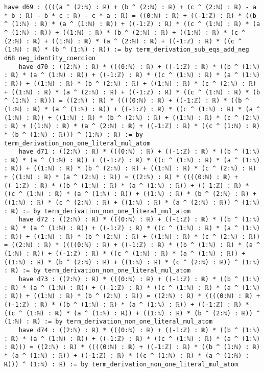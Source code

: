 \documentclass{article}
\begin{document}
\begin{tcolorbox}[colback=white!10, width=\linewidth]
\begin{lstlisting}[language=Lean4]
    have d69 : ((((a ^ (2:ℕ) : ℝ) + (b ^ (2:ℕ) : ℝ) + (c ^ (2:ℕ) : ℝ) - a * b : ℝ) - b * c : ℝ) - c * a : ℝ) = ((0:ℕ) : ℝ) + ((-1:ℤ) : ℝ) * ((b ^ (1:ℕ) : ℝ) * (a ^ (1:ℕ) : ℝ)) + ((-1:ℤ) : ℝ) * ((c ^ (1:ℕ) : ℝ) * (a ^ (1:ℕ) : ℝ)) + ((1:ℕ) : ℝ) * (b ^ (2:ℕ) : ℝ) + ((1:ℕ) : ℝ) * (c ^ (2:ℕ) : ℝ) + ((1:ℕ) : ℝ) * (a ^ (2:ℕ) : ℝ) + ((-1:ℤ) : ℝ) * ((c ^ (1:ℕ) : ℝ) * (b ^ (1:ℕ) : ℝ)) := by term_derivation_sub_eqs_add_neg d68 neg_identity_coercion
    have d70 : ((2:ℕ) : ℝ) * (((0:ℕ) : ℝ) + ((-1:ℤ) : ℝ) * ((b ^ (1:ℕ) : ℝ) * (a ^ (1:ℕ) : ℝ)) + ((-1:ℤ) : ℝ) * ((c ^ (1:ℕ) : ℝ) * (a ^ (1:ℕ) : ℝ)) + ((1:ℕ) : ℝ) * (b ^ (2:ℕ) : ℝ) + ((1:ℕ) : ℝ) * (c ^ (2:ℕ) : ℝ) + ((1:ℕ) : ℝ) * (a ^ (2:ℕ) : ℝ) + ((-1:ℤ) : ℝ) * ((c ^ (1:ℕ) : ℝ) * (b ^ (1:ℕ) : ℝ))) = ((2:ℕ) : ℝ) * ((((0:ℕ) : ℝ) + ((-1:ℤ) : ℝ) * ((b ^ (1:ℕ) : ℝ) * (a ^ (1:ℕ) : ℝ)) + ((-1:ℤ) : ℝ) * ((c ^ (1:ℕ) : ℝ) * (a ^ (1:ℕ) : ℝ)) + ((1:ℕ) : ℝ) * (b ^ (2:ℕ) : ℝ) + ((1:ℕ) : ℝ) * (c ^ (2:ℕ) : ℝ) + ((1:ℕ) : ℝ) * (a ^ (2:ℕ) : ℝ) + ((-1:ℤ) : ℝ) * ((c ^ (1:ℕ) : ℝ) * (b ^ (1:ℕ) : ℝ))) ^ (1:ℕ) : ℝ) := by term_derivation_non_one_literal_mul_atom
    have d71 : ((2:ℕ) : ℝ) * (((0:ℕ) : ℝ) + ((-1:ℤ) : ℝ) * ((b ^ (1:ℕ) : ℝ) * (a ^ (1:ℕ) : ℝ)) + ((-1:ℤ) : ℝ) * ((c ^ (1:ℕ) : ℝ) * (a ^ (1:ℕ) : ℝ)) + ((1:ℕ) : ℝ) * (b ^ (2:ℕ) : ℝ) + ((1:ℕ) : ℝ) * (c ^ (2:ℕ) : ℝ) + ((1:ℕ) : ℝ) * (a ^ (2:ℕ) : ℝ)) = ((2:ℕ) : ℝ) * ((((0:ℕ) : ℝ) + ((-1:ℤ) : ℝ) * ((b ^ (1:ℕ) : ℝ) * (a ^ (1:ℕ) : ℝ)) + ((-1:ℤ) : ℝ) * ((c ^ (1:ℕ) : ℝ) * (a ^ (1:ℕ) : ℝ)) + ((1:ℕ) : ℝ) * (b ^ (2:ℕ) : ℝ) + ((1:ℕ) : ℝ) * (c ^ (2:ℕ) : ℝ) + ((1:ℕ) : ℝ) * (a ^ (2:ℕ) : ℝ)) ^ (1:ℕ) : ℝ) := by term_derivation_non_one_literal_mul_atom
    have d72 : ((2:ℕ) : ℝ) * (((0:ℕ) : ℝ) + ((-1:ℤ) : ℝ) * ((b ^ (1:ℕ) : ℝ) * (a ^ (1:ℕ) : ℝ)) + ((-1:ℤ) : ℝ) * ((c ^ (1:ℕ) : ℝ) * (a ^ (1:ℕ) : ℝ)) + ((1:ℕ) : ℝ) * (b ^ (2:ℕ) : ℝ) + ((1:ℕ) : ℝ) * (c ^ (2:ℕ) : ℝ)) = ((2:ℕ) : ℝ) * ((((0:ℕ) : ℝ) + ((-1:ℤ) : ℝ) * ((b ^ (1:ℕ) : ℝ) * (a ^ (1:ℕ) : ℝ)) + ((-1:ℤ) : ℝ) * ((c ^ (1:ℕ) : ℝ) * (a ^ (1:ℕ) : ℝ)) + ((1:ℕ) : ℝ) * (b ^ (2:ℕ) : ℝ) + ((1:ℕ) : ℝ) * (c ^ (2:ℕ) : ℝ)) ^ (1:ℕ) : ℝ) := by term_derivation_non_one_literal_mul_atom
    have d73 : ((2:ℕ) : ℝ) * (((0:ℕ) : ℝ) + ((-1:ℤ) : ℝ) * ((b ^ (1:ℕ) : ℝ) * (a ^ (1:ℕ) : ℝ)) + ((-1:ℤ) : ℝ) * ((c ^ (1:ℕ) : ℝ) * (a ^ (1:ℕ) : ℝ)) + ((1:ℕ) : ℝ) * (b ^ (2:ℕ) : ℝ)) = ((2:ℕ) : ℝ) * ((((0:ℕ) : ℝ) + ((-1:ℤ) : ℝ) * ((b ^ (1:ℕ) : ℝ) * (a ^ (1:ℕ) : ℝ)) + ((-1:ℤ) : ℝ) * ((c ^ (1:ℕ) : ℝ) * (a ^ (1:ℕ) : ℝ)) + ((1:ℕ) : ℝ) * (b ^ (2:ℕ) : ℝ)) ^ (1:ℕ) : ℝ) := by term_derivation_non_one_literal_mul_atom
    have d74 : ((2:ℕ) : ℝ) * (((0:ℕ) : ℝ) + ((-1:ℤ) : ℝ) * ((b ^ (1:ℕ) : ℝ) * (a ^ (1:ℕ) : ℝ)) + ((-1:ℤ) : ℝ) * ((c ^ (1:ℕ) : ℝ) * (a ^ (1:ℕ) : ℝ))) = ((2:ℕ) : ℝ) * ((((0:ℕ) : ℝ) + ((-1:ℤ) : ℝ) * ((b ^ (1:ℕ) : ℝ) * (a ^ (1:ℕ) : ℝ)) + ((-1:ℤ) : ℝ) * ((c ^ (1:ℕ) : ℝ) * (a ^ (1:ℕ) : ℝ))) ^ (1:ℕ) : ℝ) := by term_derivation_non_one_literal_mul_atom

\end{lstlisting}
\end{tcolorbox}
\end{document}

